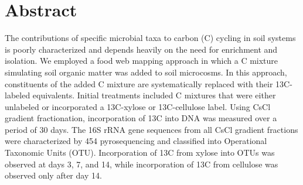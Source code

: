 \section{Abstract} 
The contributions of specific microbial taxa to carbon (C) cycling in soil systems is poorly characterized and depends heavily on the need for enrichment and isolation. We employed a food web mapping approach in which a C mixture simulating soil organic matter was added to soil microcosms. In this approach, constituents of the added C mixture are systematically replaced with their 13C-labeled equivalents. Initial treatments included C mixtures that were either unlabeled or incorporated a 13C-xylose or 13C-cellulose label. Using CsCl gradient fractionation, incorporation of 13C into DNA was measured over a period of 30 days. The 16S rRNA gene sequences from all CsCl gradient fractions were characterized by 454 pyrosequencing and classified into Operational Taxonomic Units (OTU). Incorporation of 13C from xylose into OTUs was observed at days 3, 7, and 14, while incorporation of 13C from cellulose was observed only after day 14.